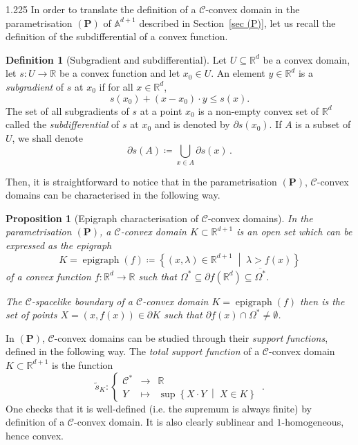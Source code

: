 \documentclass[reqno, a4paper]{amsart}
\numberwithin{equation}{section}
\numberwithin{figure}{section}
\newtheorem{proposition}[theorem]{Proposition}
\theoremstyle{definition}
\newtheorem{definition}[theorem]{Definition}
\theoremstyle{remark}
\newcommand{\R}{\mathbb{R}} %
\newcommand{\A}{\mathbb{A}} %
\DeclareMathOperator{\epi}{epigraph} %
\newcommand{\C}{\mathcal{C}} %
\newcommand{\st}{\; \middle\vert \;} %
\newcommand{\namelessfunction}[4]{ \left\lbrace \begin{matrix}
{#1} &\longrightarrow& {#2}\\
{#3} & \longmapsto & {#4}
\end{matrix} \right. }
\newcommand{\function}[5]{{#1}: \namelessfunction{#2}{#3}{#4}{#5}}
\begin{document}
\begin{spacing}{1.225}
In order to translate the definition of a $\C$-convex domain in the parametrisation $(\mathbf{P})$ of $\A^{d+1}$ described in Section~\ref{sec (P)}, let us recall the definition of the subdifferential of a convex function.

\begin{definition}[Subgradient and subdifferential]
\label{def subgrad subdif}
Let $U \subseteq \R^d$ be a convex domain, let $s: U \to \R$ be a convex function and let $x_0 \in U$. An element $y \in \R^d$ is a \emph{subgradient} of $s$ at $x_0$ if for all $x\in \R^d$,
\begin{equation*}
s(x_0) + (x-x_0) \cdot y \leq s(x). 
\end{equation*}
The set of all subgradients of $s$ at a point $x_0$ is a non-empty convex set of $\R^d$ called the \emph{subdifferential} of $s$ at $x_0$ and is denoted by $\partial s(x_0)$. If $A$ is a subset of $U$, we shall denote 
\begin{equation*}
\partial s(A) \coloneqq \bigcup_{x \in A}\partial s(x) \, . 
\end{equation*}
\end{definition}

Then, it is straightforward to notice that in the parametrisation $(\mathbf{P})$, $\C$-convex domains can be characterised in the following way.

\begin{proposition}[Epigraph characterisation of $\C$-convex domains]
\label{prop char C-convex}
In the parametrisation $(\mathbf{P})$, a $\C$-convex domain $K \subset \R^{d+1}$ is an open set which can be expressed as the epigraph
\begin{equation*}
 K= \epi(f) \coloneqq \left\lbrace(x,\lambda) \in \R^{d+1} \st \lambda>f(x)\right\rbrace
\end{equation*}
of a convex function $f: \R^d\to\R$ such that $\Omega^* \subseteq \partial f (\R^d) \subseteq \overline{\Omega^*}$.

The $\C$-spacelike boundary of a $\C$-convex domain $K = \epi(f)$ then is the set of points $X=(x,f(x)) \in \partial K$ such that $\partial f(x) \cap \Omega^* \neq \emptyset$. 
\end{proposition}


In $(\mathbf{P})$, $\C$-convex domains can be studied through their \emph{support functions}, defined in the following way. The \emph{total support function} of a $\C$-convex domain $K \subset \R^{d+1}$ is the function
\begin{equation*}
\function{\tilde{s}_K}{\C^*}{\R}{Y}{\sup \left\lbrace X\cdot Y \st X \in K\right\rbrace} \, .
\end{equation*}
One checks that it is well-defined (i.e. the supremum is always finite) by definition of a $\C$-convex domain. It is also clearly sublinear and $1$-homogeneous, hence convex. 


\end{spacing}
\end{document}

